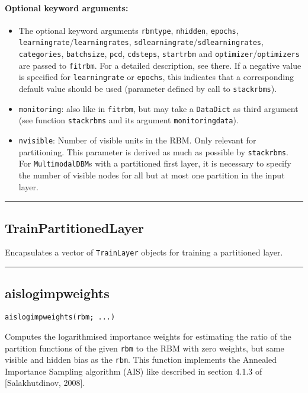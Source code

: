 \paragraph*{Optional keyword arguments:}
\begin{itemize}
\item The optional keyword arguments \texttt{rbmtype}, \texttt{nhidden}, \texttt{epochs}, \texttt{learningrate}/\texttt{learningrates}, \texttt{sdlearningrate}/\texttt{sdlearningrates}, \texttt{categories}, \texttt{batchsize}, \texttt{pcd}, \texttt{cdsteps}, \texttt{startrbm} and \texttt{optimizer}/\texttt{optimizers} are passed to \texttt{fitrbm}. For a detailed description, see there. If a negative value is specified for \texttt{learningrate} or \texttt{epochs}, this indicates that a corresponding default value should be used (parameter defined by call to \texttt{stackrbms}).


\item \texttt{monitoring}: also like in \texttt{fitrbm}, but may take a \texttt{DataDict} as third argument  (see function \texttt{stackrbms} and its argument \texttt{monitoringdata}).


\item \texttt{nvisible}: Number of visible units in the RBM. Only relevant for partitioning.  This parameter is derived as much as possible by \texttt{stackrbms}.  For \texttt{MultimodalDBM}s with a partitioned first layer, it is necessary to specify  the number of visible nodes for all but at most one partition in the input layer.

\end{itemize}
\noindent\rule{\textwidth}{1pt}
\subsection*{TrainPartitionedLayer}  \label{bms_TrainPartitionedLayer}
Encapsulates a vector of \texttt{TrainLayer} objects for training a partitioned layer.

\noindent\rule{\textwidth}{1pt}
\subsection*{aislogimpweights}  \label{bms_aislogimpweights}
\begin{verbatim}
aislogimpweights(rbm; ...)
\end{verbatim}
Computes the logarithmised importance weights for estimating the ratio of the partition functions of the given \texttt{rbm} to the RBM with zero weights, but same visible and hidden bias as the \texttt{rbm}. This function implements the Annealed Importance Sampling algorithm (AIS) like described in section 4.1.3 of [Salakhutdinov, 2008].

